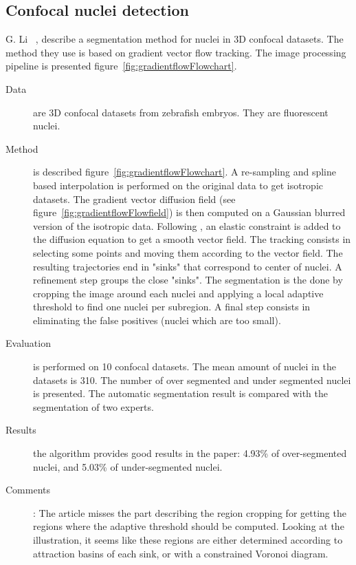 \subsection*{Confocal nuclei detection}
G. Li {\etal}~\cite{li20073}, describe a segmentation method for nuclei in 3D confocal datasets. The method they use is based on gradient vector flow tracking.
The image processing pipeline is presented figure~\ref{fig:gradientflowFlowchart}.
\begin{description}
  \item[Data] are 3D confocal datasets from zebrafish embryos. They are fluorescent nuclei.
  \item[Method] is described figure~\ref{fig:gradientflowFlowchart}. 
  A re-sampling and spline based interpolation is performed on the original data to get isotropic datasets.
  The gradient vector diffusion field (see figure~\ref{fig:gradientflowFlowfield}) is then computed on a Gaussian blurred version of the isotropic data.
  Following \cite{bajcsy1989multiresolution}, an elastic constraint is added to the diffusion equation to get a smooth vector field.
  The tracking consists in selecting some points and moving them according to the vector field. The resulting trajectories end in "sinks" that correspond to center of nuclei.
  A refinement step groups the close "sinks".
  The segmentation is the done by cropping the image around each nuclei and applying a local adaptive threshold to find one nuclei per subregion.
  A final step consists in eliminating the false positives (nuclei which are too small).
  \item[Evaluation] is performed on 10 confocal datasets. The mean amount of nuclei in the datasets is 310. The number of over segmented and under segmented nuclei is presented. The automatic segmentation result is compared with the segmentation of two experts.
  \item[Results] the algorithm provides good results in the paper: 
  4.93\% of over-segmented nuclei,
  and 5.03\% of under-segmented nuclei.
  \item[Comments]:
  The article misses the part describing the region cropping for getting the regions where the adaptive
   threshold should be computed.
   Looking at the illustration, it seems like these regions are either determined
   according to attraction basins of each sink, or with a constrained Voronoi diagram.
\end{description}
